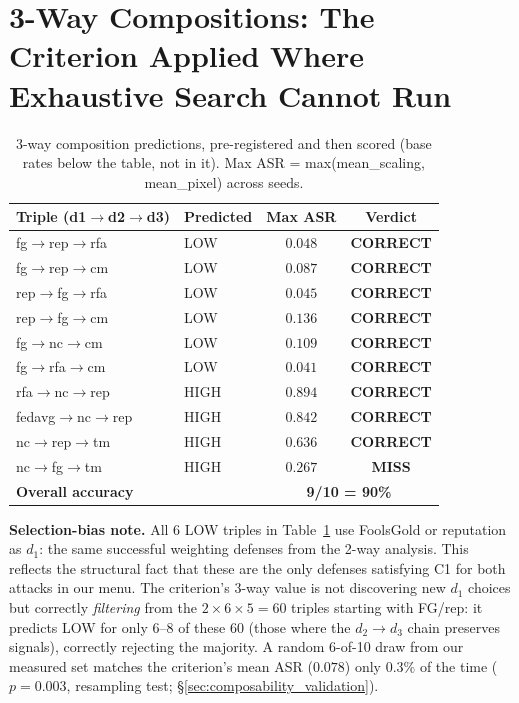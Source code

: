 \documentclass{article}
\begin{document}
\section{3-Way Compositions: The Criterion Applied Where Exhaustive Search Cannot Run}
\label{sec:three_way}\begin{table}[h]
\caption{3-way composition predictions, pre-registered and then scored (base rates below the table, not in it). Max ASR = max(mean\_scaling, mean\_pixel) across seeds.}
\label{tab:three_way}
\centering\small
\begin{tabular}{llcc}
\toprule
\textbf{Triple (d1$\to$d2$\to$d3)} & \textbf{Predicted} & \textbf{Max ASR} & \textbf{Verdict} \\
\midrule
fg$\to$rep$\to$rfa & LOW & $0.048$ & \textbf{CORRECT} \\
fg$\to$rep$\to$cm  & LOW & $0.087$ & \textbf{CORRECT} \\
rep$\to$fg$\to$rfa & LOW & $0.045$ & \textbf{CORRECT} \\
rep$\to$fg$\to$cm  & LOW & $0.136$ & \textbf{CORRECT} \\
fg$\to$nc$\to$cm   & LOW & $0.109$ & \textbf{CORRECT} \\
fg$\to$rfa$\to$cm  & LOW & $0.041$ & \textbf{CORRECT} \\
\midrule
rfa$\to$nc$\to$rep & HIGH & $0.894$ & \textbf{CORRECT} \\
fedavg$\to$nc$\to$rep & HIGH & $0.842$ & \textbf{CORRECT} \\
nc$\to$rep$\to$tm  & HIGH & $0.636$ & \textbf{CORRECT} \\
nc$\to$fg$\to$tm   & HIGH & $0.267$ & \textbf{MISS} \\
\midrule
\multicolumn{2}{l}{\textbf{Overall accuracy}} & \multicolumn{2}{c}{\textbf{9/10 = 90\%}} \\
\bottomrule
\end{tabular}
\end{table}

\textbf{Selection-bias note.} All 6 LOW triples in Table~\ref{tab:three_way} use FoolsGold or reputation as $d_1$: the same successful weighting defenses from the 2-way analysis. This reflects the structural fact that these are the only defenses satisfying C1 for both attacks in our menu. The criterion's 3-way value is not discovering new $d_1$ choices but correctly \emph{filtering} from the $2{\times}6{\times}5{=}60$ triples starting with FG/rep: it predicts LOW for only 6--8 of these 60 (those where the $d_2{\to}d_3$ chain preserves signals), correctly rejecting the majority. A random 6-of-10 draw from our measured set matches the criterion's mean ASR ($0.078$) only $0.3\%$ of the time ($p = 0.003$, resampling test; §\ref{sec:composability_validation}).
\end{document}
